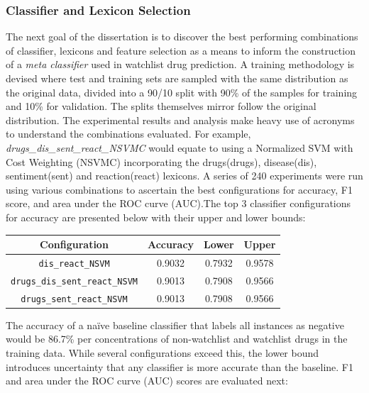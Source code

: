 \documentclass[twoside,11pt]{article}
\begin{document}
\subsubsection{Classifier and Lexicon Selection}
The next goal of the dissertation is to discover the best performing combinations of classifier, lexicons and feature selection as a means to inform the construction of a \textit{meta classifier} used in watchlist drug prediction. A training methodology is devised where test and training sets are sampled with the same distribution as the original data, divided into a 90/10 split with 90\% of the samples for training and 10\% for validation. The splits themselves mirror follow the original distribution.
The experimental results and analysis make heavy use of acronyms to understand the combinations evaluated. For example, \textit{drugs\_dis\_sent\_react\_NSVMC} would equate to using a Normalized SVM with Cost Weighting (NSVMC) incorporating the drugs(drugs), disease(dis), sentiment(sent) and reaction(react) lexicons. A series of 240 experiments were run using various combinations to ascertain the best configurations for accuracy, F1 score, and area under the ROC curve (AUC).The top 3 classifier configurations for accuracy are presented below with their upper and lower bounds:
\begin{center}
  \begin{tabular}{||c c c c||}
    \hline
    Configuration & Accuracy & Lower & Upper \\
    \hline\hline
    \verb|dis_react_NSVM| & 0.9032 & 0.7932 & 0.9578 \\
    \hline
    \verb|drugs_dis_sent_react_NSVM| & 0.9013 & 0.7908 & 0.9566 \\
    \hline
    \verb|drugs_sent_react_NSVM| & 0.9013 & 0.7908 & 0.9566 \\
    \hline
  \end{tabular}
\end{center}
The accuracy of a na\"ive baseline classifier that labels all instances as negative would be 86.7\% per concentrations of non-watchlist and watchlist drugs in the training data. While several configurations exceed this, the lower bound introduces uncertainty that any classifier is more accurate than the baseline. F1 and area under the ROC curve (AUC) scores are evaluated next:
\end{document}
